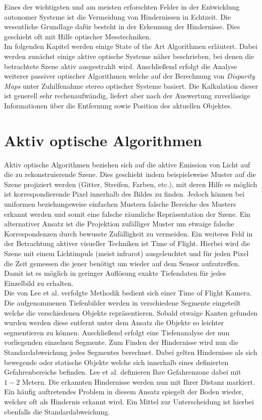 Eines der wichtigsten und am meisten erforschten Felder in der Entwicklung autonomer Systeme ist die Vermeidung von Hindernissen in Echtzeit. Die wesentliche Grundlage dafür besteht in der Erkennung der Hindernisse. Dies geschieht oft mit Hilfe optischer Messtechniken.\\
\noindent
Im folgenden Kapitel werden einige State of the Art Algorithmen erläutert. Dabei werden zunächst einige aktive optische Systeme näher beschrieben, bei denen die betrachtete Szene aktiv ausgestrahlt wird. Anschließend erfolgt die Analyse weiterer passiver optischer Algorithmen welche auf der Berechnung von \emph{Disparity Maps} unter Zuhilfenahme stereo optischer Systeme basiert. Die Kalkulation dieser ist generell sehr rechenaufwändig, liefert aber nach der Auswertung zuverlässige Informationen über die Entfernung sowie Position des aktuellen Objektes.


\section{Aktiv optische Algorithmen}
\label{sec:kamera_basierte_he}
Aktiv optische Algorithmen beziehen sich auf die aktive Emission von Licht auf die zu rekonstruierende Szene. Dies geschieht indem beispielsweise Muster auf die Szene projiziert werden (Gitter, Streifen, Farben, etc.), mit deren Hilfe es möglich ist korrespondierende Pixel innerhalb des Bildes zu finden. Jedoch können bei uniformen beziehungsweise einfachen Mustern falsche Bereiche des Musters erkannt werden und somit eine falsche räumliche Repräsentation der Szene. Ein alternativer Ansatz ist die Projektion zufälliger Muster um etwaige falsche Korrespondenzen durch bewusste Zufälligkeit zu vermeiden. Ein weiteres Feld in der Betrachtung aktiver visueller Techniken ist Time of Flight. Hierbei wird die Szene mit einem Lichtimpuls (meist infrarot) ausgeleuchtet und für jeden Pixel die Zeit gemessen die jener benötigt um wieder auf dem Sensor aufzutreffen. Damit ist es möglich in geringer Auflösung exakte Tiefendaten für jedes Einzelbild zu erhalten.\\

\noindent
Die von Lee et al. \cite{lee2012intelligent} verfolgte Methodik bedient sich einer Time of Flight Kamera. Die aufgenommenen Tiefenbilder werden in verschiedene Segmente eingeteilt welche die verschiedenen Objekte repräsentieren. Sobald etwaige Kanten gefunden wurden werden diese entfernt unter dem Ansatz die Objekte so leichter segmentieren zu können. Anschließend erfolgt eine Tiefenanalyse der nun vorliegenden einzelnen Segmente. Zum Finden der Hindernisse wird nun die Standardabweichung jedes Segmentes berechnet.
Dabei gelten Hindernisse als sich bewegende oder statische Objekte welche sich innerhalb eines definierten Gefahrenbereichs befinden. Lee et al. definieren Ihre Gefahrenzone dabei mit $1-2$ Metern. Die erkannten Hindernisse werden nun mit Ihrer Distanz markiert. Ein häufig auftretendes Problem in diesem Ansatz spiegelt der Boden wieder, welcher oft als Hindernis erkannt wird. Ein Mittel zur Unterscheidung ist hierbei ebenfalls die Standardabweichung.\\

